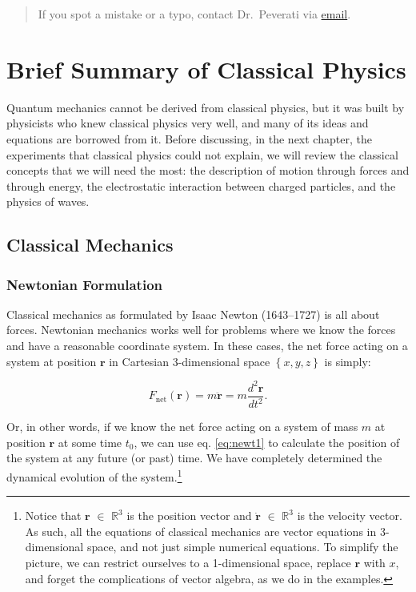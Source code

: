 \documentclass[
  english,
  9pt,
]{extbook}
\let\origdoublepage\cleardoublepage
\newcommand{\clearemptydoublepage}{%
  \clearpage
  {\pagestyle{empty}\origdoublepage}%
}
\let\cleardoublepage\clearemptydoublepage
\theoremstyle{definition}
\theoremstyle{definition}
\theoremstyle{definition}
\theoremstyle{definition}
\theoremstyle{remark}
\begin{document}
\begin{quote}
If you spot a mistake or a typo, contact Dr.~Peverati via \href{mailto:rpeverati@fit.edu}{email}.
\end{quote}

\cleardoublepage
{}

\chapter{Brief Summary of Classical Physics}\label{Classical}

Quantum mechanics cannot be derived from classical physics, but it was built by physicists who knew classical physics very well, and many of its ideas and equations are borrowed from it. Before discussing, in the next chapter, the experiments that classical physics could not explain, we will review the classical concepts that we will need the most: the description of motion through forces and through energy, the electrostatic interaction between charged particles, and the physics of waves.

\section{Classical Mechanics}\label{classical-mechanics}

\subsection{Newtonian Formulation}\label{newtonian-formulation}

Classical mechanics as formulated by Isaac Newton (1643--1727) is all about forces. Newtonian mechanics works well for problems where we know the forces and have a reasonable coordinate system. In these cases, the net force acting on a system at position \(\mathbf{r}\) in Cartesian 3-dimensional space \(\left\{ x,y,z \right\}\) is simply:

\begin{equation}
F_{\mathrm{net}}(\mathbf{r}) = m\ddot{\mathbf{r}} = m \frac{d^2 \mathbf{r}}{dt^2}.
\label{eq:newt1}
\end{equation}

Or, in other words, if we know the net force acting on a system of mass \(m\) at position \(\mathbf{r}\) at some time \(t_0\), we can use eq. \eqref{eq:newt1} to calculate the position of the system at any future (or past) time. We have completely determined the dynamical evolution of the system.\footnote{Notice that \(\mathbf{r}\) \(\in\) \(\mathbb{R}^{3}\) is the position vector and \(\dot{\mathbf{r}}\) \(\in\) \(\mathbb{R}^{3}\) is the velocity vector. As such, all the equations of classical mechanics are vector equations in 3-dimensional space, and not just simple numerical equations. To simplify the picture, we can restrict ourselves to a 1-dimensional space, replace \(\mathbf{r}\) with \(x\), and forget the complications of vector algebra, as we do in the examples.}
\end{document}

